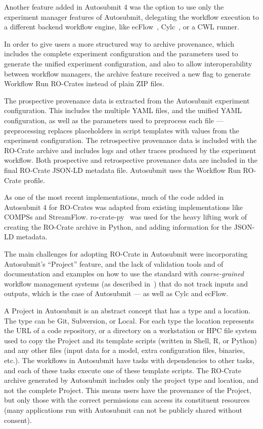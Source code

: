 \documentclass[10pt,letterpaper]{article}
\begin{document}
Another feature added in Autosubmit 4 was the option to use only the experiment manager features of Autosubmit, delegating the workflow execution to a different backend workflow engine, like ecFlow~\cite{Bahra 2011}, Cylc~\cite{Oliver 2023}, or a CWL runner.

In order to give users a more structured way to archive provenance, which includes the complete experiment configuration and the parameters used to generate the unified experiment configuration, and also to allow interoperability between workflow managers, the archive feature received a new flag to generate Workflow Run RO-Crates instead of plain ZIP files.

The prospective provenance data is extracted from the Autosubmit experiment configuration.
This includes the multiple YAML files, and the unified YAML configuration, as well as the parameters used to preprocess each file --- preprocessing replaces placeholders in script templates with values from the experiment configuration.
The retrospective provenance data is included with the RO-Crate archive and includes logs and other traces produced by the experiment workflow.
Both prospective and retrospective provenance data are included in the final RO-Crate JSON-LD metadata file. Autosubmit uses the Workflow Run RO-Crate profile.

As one of the most recent implementations, much of the code added in Autosubmit 4 for RO-Crates was adapted from existing implementations like COMPSs and StreamFlow.
ro-crate-py~\cite{De Geest 2022a} was used for the heavy lifting work of creating the RO-Crate archive in Python, and adding information for the JSON-LD metadata.

The main challenges for adopting RO-Crate in Autosubmit were incorporating Autosubmit's ``Project'' feature, and the lack of validation tools and of documentation and examples on how to use the standard with \emph{coarse-grained} workflow management systems (as described in~\cite{Goble 2020}) that do not track inputs and outputs, which is the case of Autosubmit --- as well as Cylc and ecFlow.

A Project in Autosubmit is an abstract concept that has a type and a location.
The type can be Git, Subversion, or Local.
For each type the location represents the URL of a code repository, or a directory on a workstation or HPC file system used to copy the Project and its template scripts (written in Shell, R, or Python) and any other files (input data for a model, extra configuration files, binaries, etc.).
The workflows in Autosubmit have tasks with dependencies to other tasks, and each of these tasks execute one of these template scripts.
The RO-Crate archive generated by Autosubmit includes only the project type and location, and not the complete Project.
This means users have the provenance of the Project, but only those with the correct permissions can access its constituent resources (many applications run with Autosubmit can not be publicly shared without consent).
\end{document}
